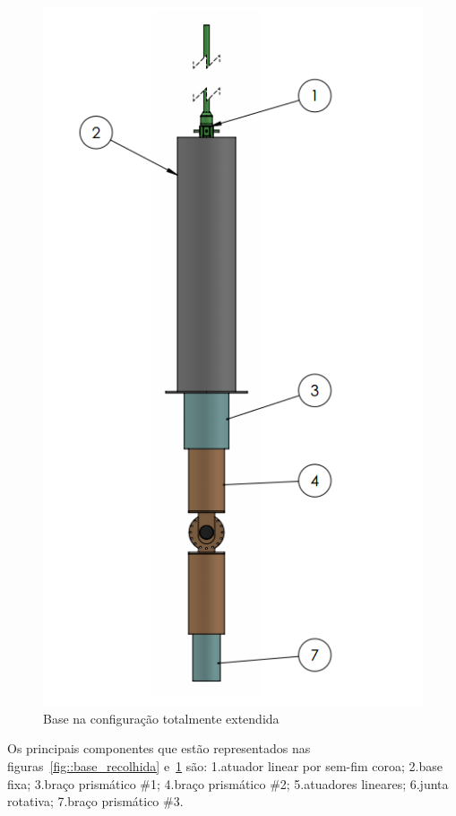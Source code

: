 \begin{figure}[h!]
\centering
	\includegraphics[width=\columnwidth]{figs/estudo/solid/base_extendida.png} 
	\caption{Base na configuração totalmente extendida}
	\label{fig::base_extendida}
\end{figure}
Os principais componentes que estão representados nas
figuras~\ref{fig::base_recolhida} e~\ref{fig::base_extendida} são: 1.atuador
linear por sem-fim coroa; 2.base fixa; 3.braço prismático \#1; 4.braço
prismático \#2; 5.atuadores lineares; 6.junta rotativa; 7.braço prismático \#3.

